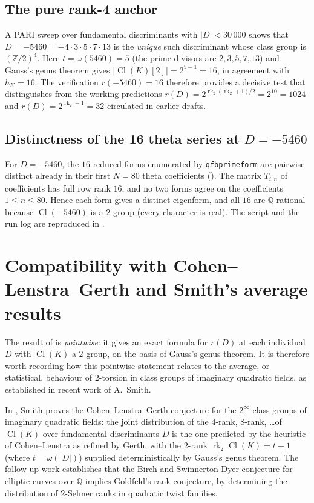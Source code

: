 \documentclass[11pt]{amsart}
\theoremstyle{definition}
\theoremstyle{remark}
\DeclareMathOperator{\Cl}{Cl}
\DeclareMathOperator{\rk}{rk}
\newcommand{\Q}{\mathbb{Q}}
\newcommand{\Z}{\mathbb{Z}}
\begin{document}
\subsection{The pure rank-4 anchor}
A PARI sweep over fundamental discriminants with \(|D| < 30\,000\)
shows that \(D = -5460 = -4 \cdot 3 \cdot 5 \cdot 7 \cdot 13\) is the
\emph{unique} such discriminant whose class group is \((\Z/2)^4\).
Here \(t = \omega(5460) = 5\) (the prime divisors are \(2, 3, 5, 7,
13\)) and Gauss's genus theorem gives \(|\Cl(K)[2]| = 2^{5-1} = 16\),
in agreement with \(h_K = 16\). The verification
\(r(-5460) = 16\) therefore provides a decisive test that
distinguishes  from the working predictions
\(r(D) = 2^{\rk_2(\rk_2+1)/2} = 2^{10} = 1024\) and
\(r(D) = 2^{\rk_2 + 1} = 32\) circulated in earlier drafts.

\subsection{Distinctness of the 16 theta series at \(D = -5460\)}
For \(D = -5460\), the \(16\) reduced forms enumerated by
\texttt{qfbprimeform} are pairwise distinct already in their first
\(N = 80\) theta coefficients (). The matrix
\(T_{i,n}\) of coefficients has full row rank \(16\), and no two
forms agree on the coefficients \(1 \le n \le 80\). Hence each form
gives a distinct eigenform, and all \(16\) are \(\Q\)-rational because
\(\Cl(-5460)\) is a \(2\)-group (every character is real). The
script and the run log are reproduced in .

\section{Compatibility with Cohen--Lenstra--Gerth and Smith's average results}\label{sec:smith}

The result of  is \emph{pointwise}: it gives an exact
formula for \(r(D)\) at each individual \(D\) with \(\Cl(K)\) a
\(2\)-group, on the basis of Gauss's genus theorem. It is therefore
worth recording how this pointwise statement relates to the average,
or statistical, behaviour of \(2\)-torsion in class groups of
imaginary quadratic fields, as established in recent work of A.~Smith.

In \cite{Smith2017}, Smith proves the Cohen--Lenstra--Gerth conjecture
for the \(2^{\infty}\)-class groups of imaginary quadratic fields:
the joint distribution of the \(4\)-rank, \(8\)-rank, \dots of
\(\Cl(K)\) over fundamental discriminants \(D\) is the one predicted by
the heuristic of Cohen--Lenstra as refined by Gerth, with the
\(2\)-rank \(\rk_2 \Cl(K) = t - 1\) (where \(t = \omega(|D|)\)) supplied
deterministically by Gauss's genus theorem. The follow-up work
\cite{Smith2025} establishes that the Birch and Swinnerton-Dyer
conjecture for elliptic curves over \(\Q\) implies Goldfeld's rank
conjecture, by determining the distribution of \(2\)-Selmer ranks in
quadratic twist families.
\end{document}
